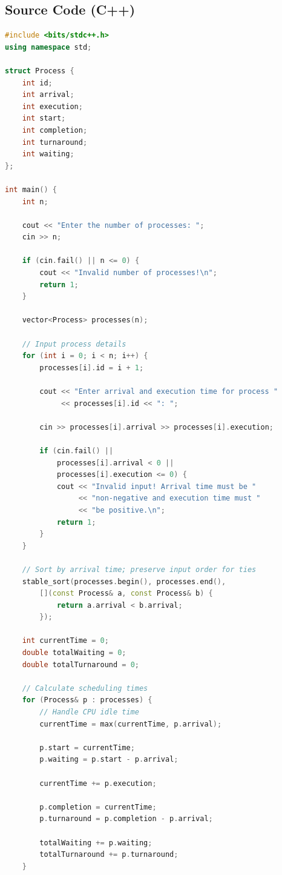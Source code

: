 \documentclass[10pt,a4paper]{article}
\begin{document}
\subsection{Source Code (C++)}
\begin{lstlisting}[language=C++]
#include <bits/stdc++.h>
using namespace std;

struct Process {
    int id;
    int arrival;
    int execution;
    int start;
    int completion;
    int turnaround;
    int waiting;
};

int main() {
    int n;

    cout << "Enter the number of processes: ";
    cin >> n;

    if (cin.fail() || n <= 0) {
        cout << "Invalid number of processes!\n";
        return 1;
    }

    vector<Process> processes(n);

    // Input process details
    for (int i = 0; i < n; i++) {
        processes[i].id = i + 1;

        cout << "Enter arrival and execution time for process "
             << processes[i].id << ": ";

        cin >> processes[i].arrival >> processes[i].execution;

        if (cin.fail() ||
            processes[i].arrival < 0 ||
            processes[i].execution <= 0) {
            cout << "Invalid input! Arrival time must be "
                 << "non-negative and execution time must "
                 << "be positive.\n";
            return 1;
        }
    }

    // Sort by arrival time; preserve input order for ties
    stable_sort(processes.begin(), processes.end(),
        [](const Process& a, const Process& b) {
            return a.arrival < b.arrival;
        });

    int currentTime = 0;
    double totalWaiting = 0;
    double totalTurnaround = 0;

    // Calculate scheduling times
    for (Process& p : processes) {
        // Handle CPU idle time
        currentTime = max(currentTime, p.arrival);

        p.start = currentTime;
        p.waiting = p.start - p.arrival;

        currentTime += p.execution;

        p.completion = currentTime;
        p.turnaround = p.completion - p.arrival;

        totalWaiting += p.waiting;
        totalTurnaround += p.turnaround;
    }


\end{lstlisting}
\end{document}
